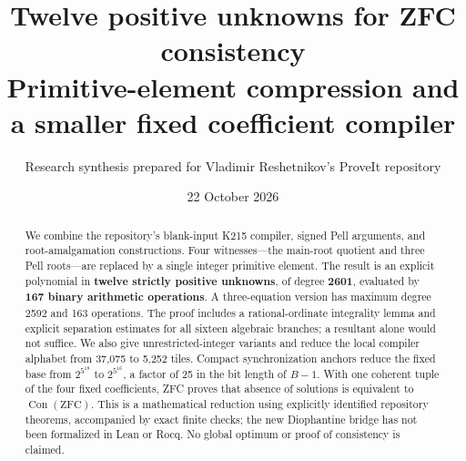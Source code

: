 \documentclass[11pt,a4paper]{article}
\title{Twelve positive unknowns for ZFC consistency\\[4pt]\large Primitive-element compression and a smaller fixed coefficient compiler}
\author{Research synthesis prepared for Vladimir Reshetnikov's ProveIt repository}
\date{22 October 2026}
\theoremstyle{remark}\newtheorem{remark}[theorem]{Remark}
\newcommand{\Con}{\operatorname{Con}}
\begin{document}
\maketitle
\begin{abstract}
We combine the repository's blank-input K215 compiler, signed Pell
arguments, and root-amalgamation constructions.  Four witnesses---the
main-root quotient and three Pell roots---are replaced by a single
integer primitive element.  The result is an explicit polynomial in
\textbf{twelve strictly positive unknowns}, of degree \textbf{2601},
evaluated by \textbf{167 binary arithmetic operations}.  A three-equation
version has maximum degree 2592 and 163 operations.  The proof includes
a rational-ordinate integrality lemma and explicit separation estimates
for all sixteen algebraic branches; a resultant alone would not suffice.
We also give unrestricted-integer variants and reduce the local compiler
alphabet from 37,075 to 5,252 tiles.  Compact synchronization anchors
reduce the fixed base from $2^{5^{18}}$ to $2^{5^{16}}$, a factor of 25
in the bit length of $B-1$.  With one coherent tuple of the four fixed
coefficients, ZFC proves that absence of solutions is equivalent to
$\Con(\mathrm{ZFC})$.  This is a mathematical reduction using explicitly
identified repository theorems, accompanied by exact finite checks; the
new Diophantine bridge has not been formalized in Lean or Rocq.  No
global optimum or proof of consistency is claimed.
\end{abstract}
\newpage
\tableofcontents
\newpage






\end{document}
